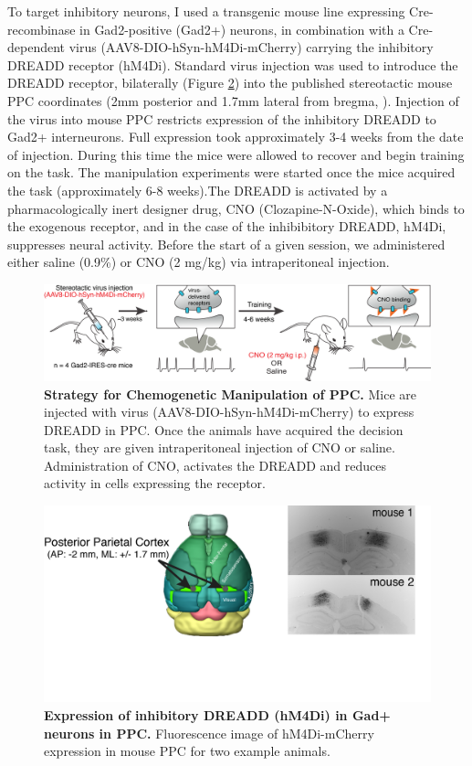 To target inhibitory neurons, I used a transgenic mouse line expressing Cre-recombinase in Gad2-positive (Gad2+) neurons, in combination with a Cre-dependent virus (AAV8-DIO-hSyn-hM4Di-mCherry) carrying the inhibitory DREADD receptor (hM4Di). Standard virus injection was used to introduce the DREADD receptor, bilaterally (Figure \ref{fig:dreaddexpression}) into the published stereotactic mouse PPC coordinates (2mm posterior and 1.7mm lateral from bregma, \textcite{Harvey2012}). Injection of the virus into mouse PPC restricts expression of the inhibitory DREADD to Gad2+ interneurons. Full expression took approximately 3-4 weeks from the date of injection. During this time the mice were allowed to recover and begin training on the task. The manipulation experiments were started once the mice acquired the task (approximately 6-8 weeks).The DREADD is activated by a pharmacologically inert designer drug, CNO (Clozapine-N-Oxide), which binds to the exogenous receptor, and in the case of the inhibibitory DREADD, hM4Di, suppresses neural activity. Before the start of a given session, we administered either saline (0.9\%) or CNO (2 mg/kg) via intraperitoneal injection.
\begin{figure}
  \centering
  \includegraphics[width=\textwidth]{Figures/chapter3/DREADD_strategy.png}
  \caption[Strategy for Chemogenetic Manipulation of PPC]{\textbf{Strategy for Chemogenetic Manipulation of PPC.} Mice are injected with virus (AAV8-DIO-hSyn-hM4Di-mCherry) to express DREADD in PPC. Once the animals have acquired the decision task, they are given intraperitoneal injection of CNO or saline. Administration of CNO, activates the DREADD and reduces activity in cells expressing the receptor.}
   \label{fig:dreaddstrategy}
\end{figure}
\begin{figure}
  \centering
  \includegraphics[width=\textwidth]{Figures/chapter3/DREADD_expression.png}
  \caption[Expression of inhibitory DREADD (hM4Di) in Gad+ neurons in PPC]{\textbf{Expression of inhibitory DREADD (hM4Di) in Gad+ neurons in PPC.} Fluorescence image of hM4Di-mCherry expression in mouse PPC for two example animals.}
   \label{fig:dreaddexpression}
\end{figure}
